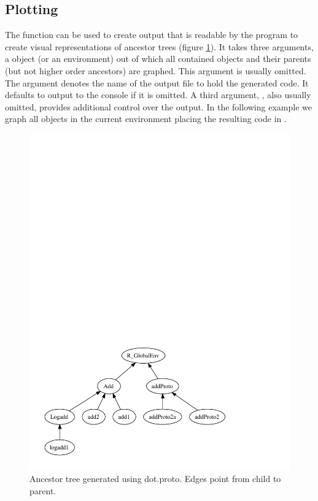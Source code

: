 \documentclass{Z}
\begin{document}
\subsection{Plotting}
\label{sec:plot}

The  function can be used to create output that is
readable by the   program \citep{Ganser+North:1999}
to create visual representations of ancestor trees (figure
\ref{fig:proto-dot}).  It takes three arguments, a  object
(or an environment) out of which all contained  objects
and their parents (but not higher order ancestors) are graphed.  This
argument is usually omitted.  The  
 argument denotes the name of the output file to hold
the generated  code.  It defaults to output to the console
if it is omitted.  A third argument, , 
also usually omitted, provides additional control over the output.  
In the following example we graph all  objects in the
current environment placing the resulting  code in
.




\begin{figure}[htbp]
\begin{center}
\includegraphics{test.pdf}
\caption{\label{fig:proto-dot} Ancestor tree generated using dot.proto. Edges
point from child to parent.}
\end{center}
\end{figure}
\end{document}
